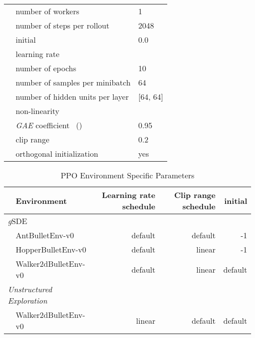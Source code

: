 \documentclass{article}
\newcommand{\ourSDE}{\textit{g}\textsc{SDE}\xspace}
\newcommand{\ppo}{\textsc{PPO}\xspace}
\begin{document}
\begin{table}[h]
\begin{tabular}{@{}l l| l@{}}
    & number of workers &  1\\
    & number of steps per rollout & 2048\\
    & initial  & 0.0\\
    & learning rate & \\
    & number of epochs & 10\\
    & number of samples per minibatch & 64\\
    & number of hidden units per layer & [64, 64]\\
    & non-linearity & \\
    & \textit{GAE} coefficient~\citep{schulman2015high} () &  0.95\\
    & clip range & 0.2 \\
    & orthogonal initialization~\citep{engstrom2020implementation} & yes \\

    \bottomrule
  \end{tabular}
\end{table}


\begin{table}[h]
\renewcommand{\arraystretch}{1.1}
\centering
\caption{\ppo Environment Specific Parameters}
\label{tab:env_params}
\vspace{1mm}
  \begin{tabular}{@{}l l r r r@{}}
    \toprule
    & Environment 	& Learning rate schedule & Clip range schedule & initial \\
    \midrule
    \multicolumn{2}{l}{\ourSDE}& \\
      & AntBulletEnv-v0 & default & default & -1\\
      & HopperBulletEnv-v0 & default & linear & -1\\
      & Walker2dBulletEnv-v0 & default & linear & default\\
    \midrule
    \multicolumn{2}{l}{\textit{Unstructured Exploration}}& \\
      & Walker2dBulletEnv-v0 & linear & default & default\\
    \bottomrule
  \end{tabular}
\end{table}


 
\end{document}
